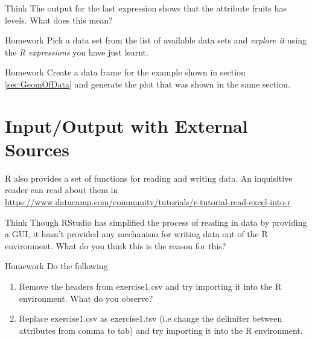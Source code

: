 \documentclass[12pt]{book}\usepackage{knitr}
\begin{document}
\begin{DIY}{Think}
The output for the last expression shows that the attribute fruits has levels. What does this mean?
\end{DIY}

\begin{DIY}{Homework}
Pick a data set from the list of available data sets and \emph{explore it} using the \emph{R expressions} you have just learnt.
\end{DIY}

\begin{DIY}{Homework}
Create a data frame for the example shown in section \ref{sec:GeomOfData} and generate the plot that was shown in the same section.
\end{DIY}


\newpage
\section{Input/Output with External Sources}
\begin{HIGHLIGHT}
\par{}
R also provides a set of functions for reading and writing data. An inquisitive reader can read about them in \textcolor{cyan}{\url{https://www.datacamp.com/community/tutorials/r-tutorial-read-excel-into-r}}
\end{HIGHLIGHT}

\begin{DIY}{Think}
Though RStudio has simplified the process of reading in data by providing a GUI, it hasn't provided any mechanism for writing data out of the R environment. What do you think this is the reason for this?  
\end{DIY}

\begin{DIY}{Homework}
Do the following
\begin{enumerate}
  \item Remove the headers from exercise1.csv and try importing it into the R environment. What do you observe?
  \item Replace exercise1.csv as exercise1.tsv (i.e change the delimiter between attributes from comma to tab) and try importing it into the R environment.
\end{enumerate}
\end{DIY}
\end{document}
